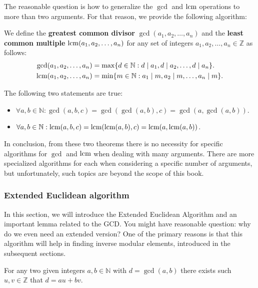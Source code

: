 \documentclass[../lecture-notes.tex]{subfiles}
\begin{document}
The reasonable question is how to generalize the $\gcd$ and $\text{lcm}$ operations to more than two arguments. 
For that reason, we provide the following algorithm:
\begin{definition}
    We define the \textbf{greatest common divisor} $\gcd(a_1, a_2, \dots, a_n)$ and the \textbf{least common multiple} $\text{lcm}(a_1, a_2, \dots, a_n)$ for any set of integers $a_1, a_2, \dots, a_n \in \mathbb{Z}$ as follows:
    \begin{align*}
        \text{gcd}(a_1, a_2, \dots, a_n) &= \max\{ d \in \mathbb{N}: d \mid a_1, d \mid a_2, \dots, d \mid a_n \}. \\
        \text{lcm}(a_1, a_2, \dots, a_n) &= \min\{ m \in \mathbb{N}: a_1 \mid m, a_2 \mid m, \dots, a_n \mid m \}.
    \end{align*}
\end{definition}

\begin{theorem}
    The following two statements are true:
    \begin{itemize}
        \item $\forall a, b \in \mathbb{N}: \gcd(a, b, c) = \gcd(\gcd(a, b), c) = \gcd(a, \gcd(a, b))$.
        \item $\forall a, b \in \mathbb{N}: \text{lcm}(a, b, c) = \text{lcm}(\text{lcm}(a, b), c) = \text{lcm}(a, \text{lcm}(a, b))$.
    \end{itemize}
\end{theorem}

In conclusion, from these two theorems there is no necessity for specific
algorithms for $\gcd$ and $\text{lcm}$ when dealing with many arguments. There are
more specialized algorithms for each when considering a specific number of
arguments, but unfortunately, such topics are beyond the scope of this book.

\subsubsection{Extended Euclidean algorithm}

In this section, we will introduce the Extended Euclidean Algorithm and an
important lemma related to the GCD. You might have reasonable question: why do
we even need an extended version? One of the primary reasons is that this 
algorithm will help in finding inverse modular elements, introduced in the 
subsequent sections.

\begin{lemma}  \label{lemma:bezout_identity}
    For any two given integers $a, b \in \mathbb{N}$ with $d = \gcd(a, b)$ there exists such $u, v \in \mathbb{Z}$ that $d = au + bv$.
\end{lemma}
\end{document}
